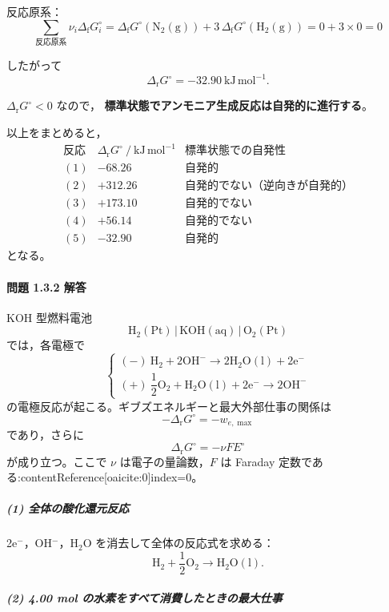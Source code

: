 \documentclass[a4paper,12pt]{jlreq}
\begin{document}
反応原系：
\[
\sum_{\text{反応原系}} \nu_i \Delta_{\mathrm f}G_i^\circ
= \Delta_{\mathrm f}G^\circ(\mathrm{N_2(g)})
  + 3\,\Delta_{\mathrm f}G^\circ(\mathrm{H_2(g)})
= 0 + 3\times 0 = 0
\]

したがって
\[
\Delta_{\mathrm r}G^\circ
= -32.90\ \mathrm{kJ\,mol^{-1}}.
\]

$\Delta_{\mathrm r}G^\circ<0$ なので，
\textbf{標準状態でアンモニア生成反応は自発的に進行する}。

\noindent
以上をまとめると，
\[
\begin{array}{c|c|c}
\text{反応} & \Delta_{\mathrm r}G^\circ\ /\ \mathrm{kJ\,mol^{-1}} & \text{標準状態での自発性} \\
\hline
(1) & -68.26  & \text{自発的} \\
(2) & +312.26 & \text{自発的でない（逆向きが自発的）} \\
(3) & +173.10 & \text{自発的でない} \\
(4) & +56.14  & \text{自発的でない} \\
(5) & -32.90  & \text{自発的}
\end{array}
\]
となる。





\newpage



\paragraph{問題 1.3.2 解答}

KOH 型燃料電池
\[
\mathrm{H_2(Pt)\,|\,KOH(aq)\,|\,O_2(Pt)}
\]
では，各電極で
\[
\begin{cases}
(-)\ \mathrm{H_2 + 2OH^- \rightarrow 2H_2O(l) + 2e^-} \\
(+)\ \dfrac{1}{2}\mathrm{O_2 + H_2O(l) + 2e^- \rightarrow 2OH^-}
\end{cases}
\]
の電極反応が起こる。ギブズエネルギーと最大外部仕事の関係は
\[
-\Delta_{\mathrm r}G^\circ = -w_{e,\max}
\]
であり，さらに
\[
\Delta_{\mathrm r}G^\circ = -\nu F E^\circ
\]
が成り立つ。ここで $\nu$ は電子の量論数，$F$ は Faraday 定数である:contentReference[oaicite:0]{index=0}。

\subparagraph{(1) 全体の酸化還元反応}

2e$^-$，OH$^-$，H$_2$O を消去して全体の反応式を求める：
\[
\mathrm{H_2 + \frac{1}{2}O_2 \rightarrow H_2O(l)}.
\]

\subparagraph{(2) 4.00 mol の水素をすべて消費したときの最大仕事}
\end{document}
